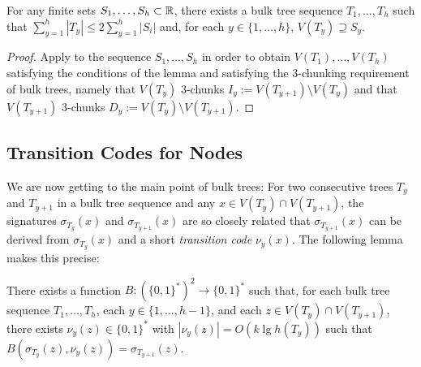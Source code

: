 \documentclass[kpfonts]{patmorin}
\begin{document}
\begin{lem}
  For any finite sets $S_1,\ldots,S_h\subset\mathbb{R}$, there exists a bulk tree sequence $T_1,\ldots,T_h$ such that $\sum_{y=1}^h |T_y|\le 2\sum_{y=1}^h |S_i|$ and, for each $y\in\{1,\ldots,h\}$, $V(T_y)\supseteq S_y$.
\end{lem}

\begin{proof}
  Apply  to the sequence $S_1,\ldots,S_h$ in order to obtain $V(T_1),\ldots,V(T_h)$ satisfying the conditions of the lemma and satisfying the 3-chunking requirement of bulk trees, namely that $V(T_y)$ 3-chunks $I_y:=V(T_{y+1})\setminus V(T_y)$ and that $V(T_{y+1})$ 3-chunks $D_y:=V(T_y)\setminus V(T_{y+1})$.
\end{proof}

\subsection{Transition Codes for Nodes}

We are now getting to the main point of bulk trees:  For two consecutive trees $T_y$ and $T_{y+1}$ in a bulk tree sequence and any $x\in V(T_y)\cap V(T_{y+1})$, the signatures $\sigma_{T_y}(x)$ and $\sigma_{T_{y+1}}(x)$ are so closely related that $\sigma_{T_{y+1}}(x)$ can be derived from $\sigma_{T_y}(x)$ and a short \emph{transition code} $\nu_y(x)$.  The following lemma makes this precise:

\begin{lem}
  There exists a function $B:(\{0,1\}^*)^2\to\{0,1\}^*$ such that, for each bulk tree sequence $T_1,\ldots,T_h$, each $y\in\{1,\ldots,h-1\}$, and each $z\in V(T_y)\cap V(T_{y+1})$, there exists $\nu_y(z)\in\{0,1\}^*$ with $|\nu_y(z)| = O(k\lg h(T_y))$ such that $B(\sigma_{T_y}(z), \nu_y(z)) = \sigma_{T_{y+1}}(z)$.  
\end{lem}
\end{document}
